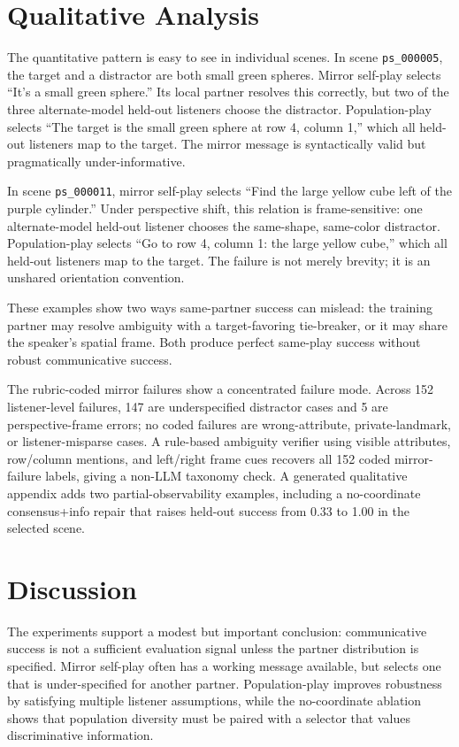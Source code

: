 \section{Qualitative Analysis}

The quantitative pattern is easy to see in individual scenes. In scene \texttt{ps\_000005}, the target and a distractor are both small green spheres. Mirror self-play selects ``It's a small green sphere.'' Its local partner resolves this correctly, but two of the three alternate-model held-out listeners choose the distractor. Population-play selects ``The target is the small green sphere at row 4, column 1,'' which all held-out listeners map to the target. The mirror message is syntactically valid but pragmatically under-informative.

In scene \texttt{ps\_000011}, mirror self-play selects ``Find the large yellow cube left of the purple cylinder.'' Under perspective shift, this relation is frame-sensitive: one alternate-model held-out listener chooses the same-shape, same-color distractor. Population-play selects ``Go to row 4, column 1: the large yellow cube,'' which all held-out listeners map to the target. The failure is not merely brevity; it is an unshared orientation convention.

These examples show two ways same-partner success can mislead: the training partner may resolve ambiguity with a target-favoring tie-breaker, or it may share the speaker's spatial frame. Both produce perfect same-play success without robust communicative success.

The rubric-coded mirror failures show a concentrated failure mode. Across 152 listener-level failures, 147 are underspecified distractor cases and 5 are perspective-frame errors; no coded failures are wrong-attribute, private-landmark, or listener-misparse cases. A rule-based ambiguity verifier using visible attributes, row/column mentions, and left/right frame cues recovers all 152 coded mirror-failure labels, giving a non-LLM taxonomy check. A generated qualitative appendix adds two partial-observability examples, including a no-coordinate consensus+info repair that raises held-out success from 0.33 to 1.00 in the selected scene.

\section{Discussion}

The experiments support a modest but important conclusion: communicative success is not a sufficient evaluation signal unless the partner distribution is specified. Mirror self-play often has a working message available, but selects one that is under-specified for another partner. Population-play improves robustness by satisfying multiple listener assumptions, while the no-coordinate ablation shows that population diversity must be paired with a selector that values discriminative information.

